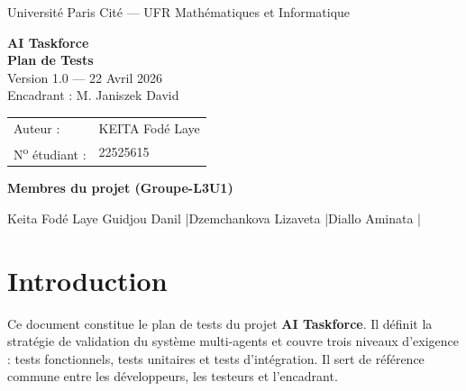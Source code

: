 \documentclass[a4paper,11pt]{report}
\begin{document}
\sloppy

\begin{titlepage}
\begin{center}
{\large Université Paris Cité --- UFR Mathématiques et Informatique}
\end{center}
\vspace{2.5cm}

\vspace{1.5cm}

\begin{center}
{\Large \textbf{AI Taskforce}}\\[0.4cm]
{\Huge \textbf{Plan de Tests}}\\[0.3cm]
{\small\color{gray} Version 1.0 --- 22 Avril 2026}\\[0.6cm]
{\small Encadrant : M. Janiszek David}
\end{center}
\vspace{2cm}
\begin{center}
\begin{tabular}{ll}
Auteur : & KEITA Fodé Laye \\
N\textsuperscript{o} étudiant : & 22525615 \\
\end{tabular}
\end{center}
\vfill
\begin{center}
\textbf{Membres du projet (Groupe-L3U1)}
\end{center}
\begin{center}
Keita Fodé Laye \quad Guidjou Danil \quad|\quad Dzemchankova Lizaveta \quad|\quad Diallo Aminata \quad|
\end{center}
\end{titlepage}

\renewcommand{\contentsname}{Sommaire}
\tableofcontents
\setcounter{section}{0}
\renewcommand{\thesection}{\arabic{section}}

\section{Introduction}

Ce document constitue le plan de tests du projet \textbf{AI Taskforce}.
Il définit la stratégie de validation du système multi-agents et couvre trois niveaux
d'exigence : tests fonctionnels, tests unitaires et tests d'intégration.
Il sert de référence commune entre les développeurs, les testeurs et l'encadrant.
\end{document}
